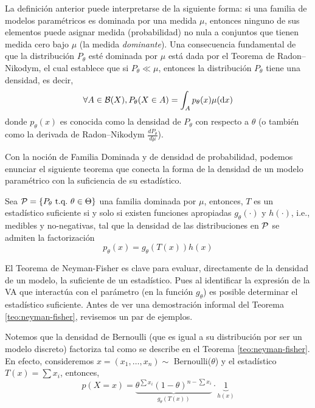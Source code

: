 La definición anterior puede interpretarse de la siguiente forma: si una familia de modelos paramétricos es dominada por una medida $\mu$, entonces ninguno de sus elementos puede asignar medida (probabilidad) no nula a conjuntos que tienen medida cero bajo $\mu$ (la medida \textit{dominante}). Una consecuencia fundamental de que la distribución $P_\theta$ esté dominada por $\mu$ está dada por el Teorema de Radon–Nikodym,  el cual establece que si $ P_\theta \ll \mu$, entonces la distribución $P_\theta$ tiene una densidad, es decir,	
	\begin{equation}
		\forall A\in{\mathcal B}(X), P_\theta(X\in A) = \int _A p_\theta(x) \mu({\text{d}} x)
	\end{equation}
donde $p_\theta(x)$ es conocida como la densidad de $P_\theta$ con respecto a $\theta$ (o también como la derivada de Radon–Nikodym  $\frac{d P_\theta}{d \mu}$).

Con la noción de Familia Dominada y de densidad de probabilidad, podemos enunciar el siguiente teorema que conecta la forma de la densidad de un modelo paramétrico con la suficiencia de su estadístico. 

\begin{theorem}
	\label{teo:neyman-fisher}
	Sea $\mathcal{P} = \{P_\theta\ {\text{t.q.}}\ \theta\in\Theta\}$  una familia dominada por $\mu$, entonces, $T$ es un estadístico suficiente si y solo si existen funciones apropiadas $g_\theta(\cdot)$ y $h(\cdot)$, i.e., medibles y no-negativas, tal que la densidad de las distribuciones en ${\mathcal P}$ se admiten la factorización  
	\begin{equation}
		\label{eq:neyman-fisher}
		p_\theta (x) = g_\theta(T(x))h(x)  
	\end{equation}
\end{theorem}

El Teorema de Neyman-Fisher es clave para evaluar, directamente de la densidad de un modelo, la suficiente de un estadístico. Pues al identificar la expresión de la VA que interactúa con el parámetro (en la función $g_\theta$) es posible determinar el estadístico suficiente. Antes de ver una demostración informal del Teorema \ref{teo:neyman-fisher}, revisemos un par de ejemplos.

\begin{example}
	Notemos que la densidad de Bernoulli (que es igual a su distribución por ser un modelo discreto) factoriza tal como se describe en el Teorema \ref{teo:neyman-fisher}. En efecto, consideremos $x=(x_1,\ldots, x_n)\sim$ Bernoulli($\theta$) y el estadístico $T(x) = \sum x_i$, entonces, 
	\begin{equation}
		p(X=x) = \underbrace{\theta^{\sum x_i}(1-\theta)^{n-\sum x_i}}_{g_\theta(T(x))} \cdot \underbrace{1}_{h(x)}
	\end{equation}
\end{example}

